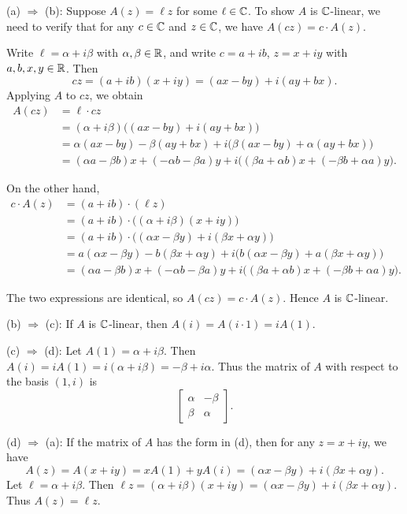 \documentclass{article}
\begin{document}
\begin{solution}
  (a) $\Rightarrow$ (b): Suppose $A(z) = \ell z$ for some $\ell \in \mathbb{C}$.
  To show $A$ is $\mathbb{C}$-linear, we need to verify that for any
  $c \in \mathbb{C}$ and $z \in \mathbb{C}$, we have $A(cz) = c \cdot A(z)$.

  Write $\ell = \alpha + i\beta$ with $\alpha, \beta \in \mathbb{R}$, and
  write $c = a + ib$, $z = x + iy$ with $a, b, x, y \in \mathbb{R}$. Then
  \[
    cz = (a+ib)(x+iy) = (ax - by) + i(ay + bx).
  \]
  Applying $A$ to $cz$, we obtain
  \[
    \begin{aligned}
      A(cz) &= \ell \cdot cz \\
      &= (\alpha + i\beta)\big((ax - by) + i(ay + bx)\big) \\
      &= \alpha(ax - by) - \beta(ay + bx)
      + i\big(\beta(ax - by) + \alpha(ay + bx)\big) \\
      &= (\alpha a - \beta b)x + (-\alpha b - \beta a)y
      + i\big((\beta a + \alpha b)x + (-\beta b + \alpha a)y\big).
    \end{aligned}
  \]

  On the other hand,
  \[
    \begin{aligned}
      c \cdot A(z) &= (a + ib) \cdot (\ell z) \\
      &= (a + ib) \cdot \big((\alpha + i\beta)(x + iy)\big) \\
      &= (a + ib) \cdot \big((\alpha x - \beta y) + i(\beta x +
      \alpha y)\big) \\
      &= a(\alpha x - \beta y) - b(\beta x + \alpha y)
      + i\big(b(\alpha x - \beta y) + a(\beta x + \alpha y)\big) \\
      &= (\alpha a - \beta b)x + (-\alpha b - \beta a)y
      + i\big((\beta a + \alpha b)x + (-\beta b + \alpha a)y\big).
    \end{aligned}
  \]

  The two expressions are identical, so $A(cz) = c \cdot A(z)$.
  Hence $A$ is $\mathbb{C}$-linear.

  (b) $\Rightarrow$ (c): If $A$ is $\mathbb{C}$-linear, then $A(i) = A(i \cdot 1) =
  i A(1)$.

  (c) $\Rightarrow$ (d): Let $A(1) = \alpha + i\beta$. Then $A(i) = iA(1)
  = i(\alpha + i\beta) = -\beta + i\alpha$. Thus the matrix of $A$ with
  respect to the basis $(1, i)$ is
  \[
    \begin{bmatrix}
      \alpha & -\beta \\
      \beta & \alpha
    \end{bmatrix}.
  \]

  (d) $\Rightarrow$ (a): If the matrix of $A$ has the form in (d), then
  for any $z = x + iy$, we have
  \[
    A(z) = A(x + iy) = xA(1) + yA(i) = (\alpha x - \beta y) + i(\beta x +
    \alpha y).
  \]
  Let $\ell = \alpha + i\beta$. Then $\ell z = (\alpha + i\beta)(x + iy)
  = (\alpha x - \beta y) + i(\beta x + \alpha y)$. Thus $A(z) = \ell z$.
\end{solution}
\end{document}
